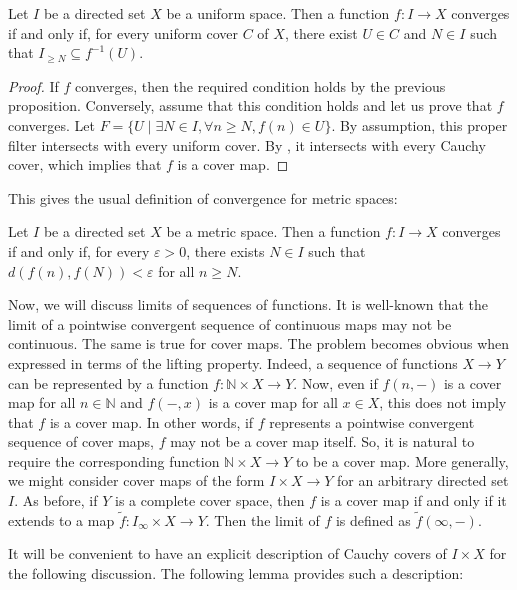 \documentclass[reqno]{amsart}
\theoremstyle{definition}
\theoremstyle{remark}
\numberwithin{figure}{section}
\begin{document}
\begin{prop}
Let $I$ be a directed set $X$ be a uniform space.
Then a function $f : I \to X$ converges if and only if, for every uniform cover $C$ of $X$, there exist $U \in C$ and $N \in I$ such that $I_{\geq N} \subseteq f^{-1}(U)$.
\end{prop}
\begin{proof}
If $f$ converges, then the required condition holds by the previous proposition.
Conversely, assume that this condition holds and let us prove that $f$ converges.
Let $F = \{ U \mid \exists N \in I, \forall n \geq N, f(n) \in U \}$.
By assumption, this proper filter intersects with every uniform cover.
By , it intersects with every Cauchy cover, which implies that $f$ is a cover map.
\end{proof}

This gives the usual definition of convergence for metric spaces:

\begin{cor}
Let $I$ be a directed set $X$ be a metric space.
Then a function $f : I \to X$ converges if and only if, for every $\varepsilon > 0$, there exists $N \in I$ such that $d(f(n),f(N)) < \varepsilon$ for all $n \geq N$.
\end{cor}

Now, we will discuss limits of sequences of functions.
It is well-known that the limit of a pointwise convergent sequence of continuous maps may not be continuous.
The same is true for cover maps.
The problem becomes obvious when expressed in terms of the lifting property.
Indeed, a sequence of functions $X \to Y$ can be represented by a function $f : \mathbb{N} \times X \to Y$.
Now, even if $f(n,-)$ is a cover map for all $n \in \mathbb{N}$ and $f(-,x)$ is a cover map for all $x \in X$, this does not imply that $f$ is a cover map.
In other words, if $f$ represents a pointwise convergent sequence of cover maps, $f$ may not be a cover map itself.
So, it is natural to require the corresponding function $\mathbb{N} \times X \to Y$ to be a cover map.
More generally, we might consider cover maps of the form $I \times X \to Y$ for an arbitrary directed set $I$.
As before, if $Y$ is a complete cover space, then $f$ is a cover map if and only if it extends to a map $\widetilde{f} : I_\infty \times X \to Y$.
Then the limit of $f$ is defined as $\widetilde{f}(\infty,-)$.

It will be convenient to have an explicit description of Cauchy covers of $I \times X$ for the following discussion.
The following lemma provides such a description:
\end{document}
